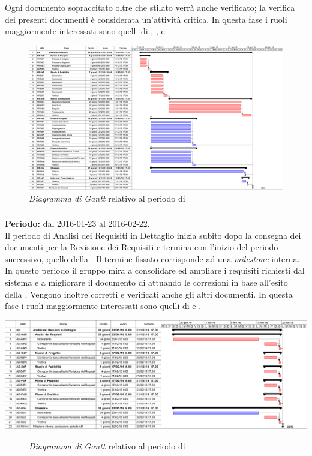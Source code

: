 Ogni documento sopraccitato oltre che stilato verrà anche verificato; la verifica dei presenti documenti è considerata un'attività critica.
In questa fase i ruoli maggiormente interessati sono quelli di \textit{\Amm}, \textit{\Res}, \textit{\Ana} e \textit{\Ver}.
\begin{figure}
	\centering
	\includegraphics[keepaspectratio = true, width=23cm]{immagini/PdP_AnalisiDeiRequisitiGantt.png}
	\caption{\textit{Diagramma di Gantt} relativo al periodo di \AR}\label{etichetta}
\end{figure}
\newpage

\subsubsection{\AD}
\textbf{Periodo:} dal 2016-01-23 al 2016-02-22. \\
Il periodo di Analisi dei Requisiti in Dettaglio inizia subito dopo la consegna dei documenti per la Revisione dei Requisiti e termina con l'inizio del periodo successivo, quello della \PA. Il termine fissato corrisponde ad una \textit{milestone} interna. \\
In questo periodo il gruppo mira a consolidare ed ampliare i requisiti richiesti dal sistema e a migliorare il documento di \textit{\AdR} attuando le correzioni in base all'esito della \RR.
Vengono inoltre corretti e verificati anche gli altri documenti.
In questa fase i ruoli maggiormente interessati sono quelli di \textit{\Ana} e \textit{\Ver}.
\begin{center}
	\includegraphics[keepaspectratio = true, width=16cm]{immagini/PdP_AnalisiDeiRequisitiInDettaglioGantt.png}
\end{center}
\begin{figure}[h]
	\caption{\textit{Diagramma di Gantt} relativo al periodo di \AD}\label{etichetta}
\end{figure}

